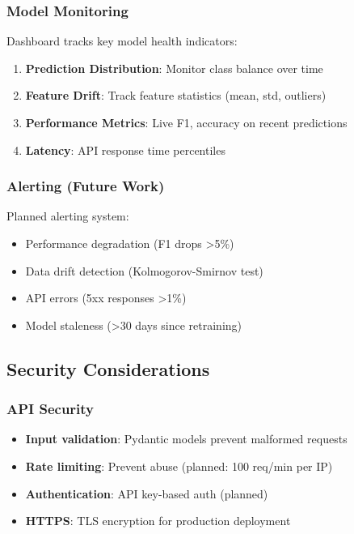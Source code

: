 \subsubsection{Model Monitoring}

Dashboard tracks key model health indicators:

\begin{enumerate}
    \item \textbf{Prediction Distribution}: Monitor class balance over time
    \item \textbf{Feature Drift}: Track feature statistics (mean, std, outliers)
    \item \textbf{Performance Metrics}: Live F1, accuracy on recent predictions
    \item \textbf{Latency}: API response time percentiles
\end{enumerate}

\subsubsection{Alerting (Future Work)}

Planned alerting system:
\begin{itemize}
    \item Performance degradation (F1 drops >5\%)
    \item Data drift detection (Kolmogorov-Smirnov test)
    \item API errors (5xx responses >1\%)
    \item Model staleness (>30 days since retraining)
\end{itemize}

\subsection{Security Considerations}

\subsubsection{API Security}

\begin{itemize}
    \item \textbf{Input validation}: Pydantic models prevent malformed requests
    \item \textbf{Rate limiting}: Prevent abuse (planned: 100 req/min per IP)
    \item \textbf{Authentication}: API key-based auth (planned)
    \item \textbf{HTTPS}: TLS encryption for production deployment
\end{itemize}

